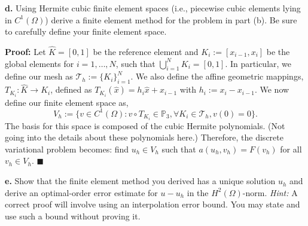 \documentclass[11pt]{article}
\begin{document}
\textbf{d.} Using Hermite cubic finite element spaces (i.e., piecewise cubic elements lying in $C^1(\Omega)$) derive a finite element method for the problem in part (b).
Be sure to carefully define your finite element space.

\vskip 1cm


\textbf{Proof:} Let $\widehat{K} = [0,1]$ be the reference element and $K_i := [x_{i-1},x_i]$ be the global elements for $i = 1, \ldots, N$, such that $\bigcup_{i=1}^N K_i = [0,1]$. 
In particular, we define our mesh as $\mathcal{T}_h := \{ K_i \}_{i=1}^N$.
We also define the affine geometric mappings, $T_{K_i} : \widehat{K} \to K_i$, defined as $T_{K_i}(\hat{x}) = h_i \hat{x} + x_{i-1}$ with $h_i := x_i - x_{i-1}$.
We now define our finite element space as,
\begin{equation}
	V_h := \{ v \in C^1(\Omega) : v\circ T_{K_i} \in \mathbb{P}_3, \forall K_i \in \mathcal{T}_h, v(0) = 0 \}.
\end{equation}
The basis for this space is composed of the cubic Hermite polynomials.
(Not going into the details about these polynomials here.)
Therefore, the discrete variational problem becomes: find $u_h \in V_h$ such that $a(u_h,v_h) = F(v_h)$ for all $v_h \in V_h$.
$\blacksquare$




\vskip 2cm

\textbf{e.} Show that the finite element method you derived has a unique solution $u_h$ and derive an optimal-order error estimate for $u - u_h$ in the $H^2(\Omega)$-norm. 
\textit{Hint:} A correct proof will involve using an interpolation error bound. You may state and use such a bound without proving it.

\vskip 0.5cm
\end{document}
